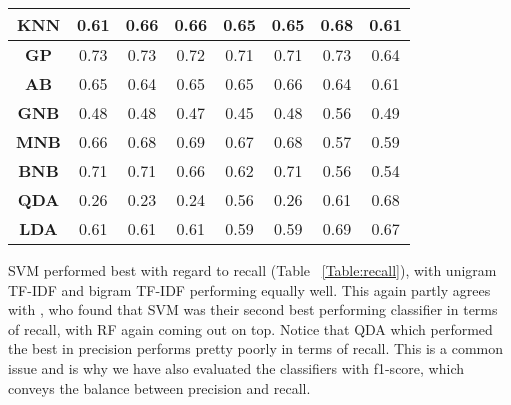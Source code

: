 \begin{table}[h!]
{\begin{tabular}{cccccccc}
\rowcolor[HTML]{EFEFEF} 
\textbf{KNN} & 0.61 & 0.66 & 0.66 & 0.65 & 0.65 & 0.68 & 0.61  \\ \hline
\textbf{GP} & 0.73 & 0.73 & 0.72 & 0.71 & 0.71 & 0.73 & 0.64  \\ \hline
\rowcolor[HTML]{EFEFEF} 
\textbf{AB} & 0.65 & 0.64 & 0.65 & 0.65 & 0.66 & 0.64 & 0.61  \\ \hline
\textbf{GNB} & 0.48 & 0.48 & 0.47 & 0.45 & 0.48 & 0.56 & 0.49  \\ \hline
\rowcolor[HTML]{EFEFEF} 
\textbf{MNB} & \multicolumn{1}{c}{\cellcolor[HTML]{EFEFEF}0.66} & 0.68 & 0.69 & 0.67 & 0.68 & 0.57 & 0.59  \\ \hline
\rowcolor[HTML]{FFFFFF} 
\textbf{BNB} & 0.71 & 0.71 & 0.66 & 0.62 & 0.71 & 0.56 & 0.54  \\ \hline
\rowcolor[HTML]{EFEFEF} 
\textbf{QDA} & 0.26 & 0.23 & 0.24 & 0.56 & 0.26 & 0.61 & 0.68  \\ \hline
\rowcolor[HTML]{FFFFFF} 
\textbf{LDA} & 0.61 & 0.61 & 0.61 & 0.59 & 0.59 & 0.69 & 0.67  \\ \hline
\end{tabular}}
\end{table}

SVM performed best with regard to recall (Table ~\ref{Table:recall}), with unigram TF-IDF and bigram TF-IDF performing equally well. This again partly agrees with \cite{Rane2018}, who found that SVM was their second best performing classifier in terms of recall, with RF again coming out on top. Notice that QDA which performed the best in precision performs pretty poorly in terms of recall. This is a common issue and is why we have also evaluated the classifiers with f1-score, which conveys the balance between precision and recall.

